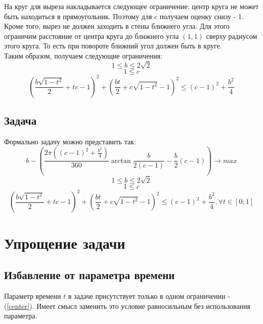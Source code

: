 На круг для выреза накладывается следующее ограничение: центр круга не может быть находиться в прямоугольник. Поэтому для $c$ получаем оценку снизу - 1. \\

Кроме того, вырез не должен заходить в стены ближнего угла. Для этого ограничим расстояние от центра круга до ближнего угла $(1,1)$ сверху радиусом этого круга. То есть при повороте ближний угол должен быть в круге. \\

Таким образом, получаем следующие ограничения:
\begin{equation}
1 \leq b \leq 2\sqrt{2}
\end{equation}
\begin{equation}
1 \leq c
\end{equation}
\begin{equation}
( \frac{b\sqrt{1-t^2}}{2}+tc - 1)^2 + (\frac{bt}{2}+c\sqrt{1-t^2}-1)^2 \leq (c-1)^2+\frac{b^2}{4}
\end{equation}

\subsection{Задача}
Формально задачу можно представить так:
\begin{equation}
b-(\frac{2\pi ((c-1)^2+\frac{b^2}{4})}{360} \arctan{\frac{b}{2(c-1)}} - \frac{b}{2}(c-1)) \rightarrow max
\end{equation}
\begin{equation}
1 \leq b \leq 2\sqrt{2}
\end{equation}
\begin{equation}
1 \leq c
\end{equation}
\begin{equation} \label{center}
( \frac{b\sqrt{1-t^2}}{2}+tc - 1)^2 + (\frac{bt}{2}+c\sqrt{1-t^2}-1)^2 \leq (c-1)^2+\frac{b^2}{4}, \forall t \in [0;1]
\end{equation}



\section{Упрощение задачи}
\subsection{Избавление от параметра времени}
Параметр времени $t$ в задаче присутствует только в одном ограничении - (\ref{center}). Имеет смысл заменить это условие равносильным без использования параметра. \\


